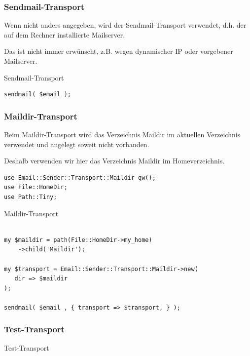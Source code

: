\subsubsection{Sendmail-Transport}

Wenn nicht anders angegeben, wird der Sendmail-Transport verwendet, d.h. der
auf dem Rechner installierte Mailserver.

Das ist nicht immer erwünscht, z.B. wegen dynamischer IP oder vorgebener
Mailserver.

\begin{frame}[fragile]{Sendmail-Transport}
\begin{verbatim}
sendmail( $email );
\end{verbatim}
\end{frame}

\subsubsection{Maildir-Transport}

Beim Maildir-Transport wird das Verzeichnis Maildir im aktuellen Verzeichnis
verwendet und angelegt soweit nicht vorhanden.

Deshalb verwenden wir hier das Verzeichnis Maildir im Homeverzeichnis.

\begin{lstlisting}
use Email::Sender::Transport::Maildir qw();
use File::HomeDir;
use Path::Tiny;
\end{lstlisting}

\begin{frame}[fragile]{Maildir-Transport}
  \begin{verbatim}

my $maildir = path(File::HomeDir->my_home)
    ->child('Maildir');

my $transport = Email::Sender::Transport::Maildir->new(
   dir => $maildir
);

sendmail( $email , { transport => $transport, } );

\end{verbatim}
\end{frame}

\subsubsection{Test-Transport}

\begin{frame}[fragile]{Test-Transport}
\begin{verbatim}

\end{verbatim}
\end{frame}

